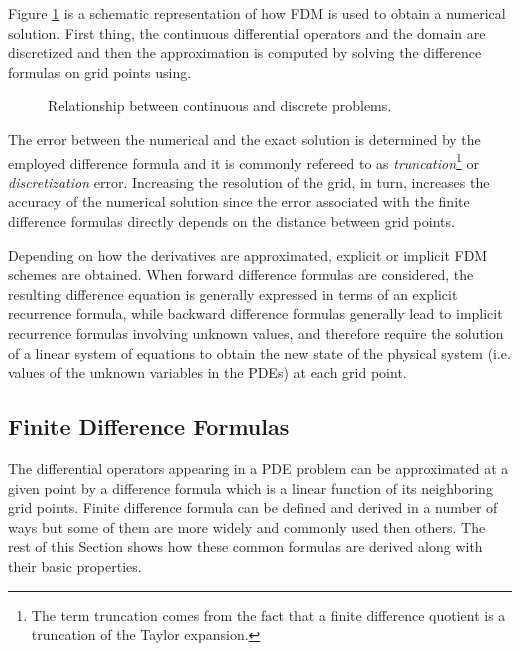 Figure \ref{fig:schematic_repr_fdm} is a schematic representation of how FDM is used to obtain a numerical solution.
First thing, the continuous differential operators and the domain are discretized and then the approximation is computed by solving the difference formulas on grid points using.
\begin{figure}[b]
    \centering
    \caption{Relationship between continuous and discrete problems.}
    \label{fig:schematic_repr_fdm}
\end{figure}    
The error between the numerical and the exact solution is determined by the employed difference formula and it is commonly refereed to as \textit{truncation}\footnote{The term truncation comes from the fact that a finite difference quotient is a truncation of the Taylor expansion.} or \textit{discretization} error.  Increasing the resolution of the grid, in turn, increases the accuracy of the numerical solution since the error associated with the finite difference formulas directly depends on the distance between grid points.

Depending on how the derivatives are approximated, explicit or implicit FDM schemes are obtained.
When forward difference formulas are considered, the
resulting difference equation is generally expressed in terms of  an explicit recurrence formula, while backward difference formulas  generally lead to implicit recurrence formulas involving unknown values, and therefore require the solution of a linear system of equations to obtain the new state of the physical system (i.e. values of the unknown variables in the PDEs) at each grid point.
    
    
\subsection{Finite Difference Formulas}
The differential operators appearing in a PDE problem can be approximated at a given point by a difference formula which is a linear function of its neighboring grid points. Finite difference formula can be defined and derived in a number of ways  but some of them are more widely and commonly used then others. The rest of this Section shows how these common formulas are derived along with their basic properties. 

